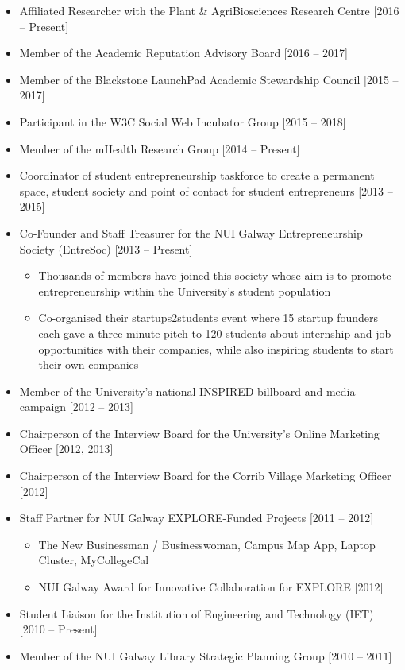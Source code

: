 \documentclass[10pt,a4paper]{res} %
\begin{document}
\begin{resume}
\begin{itemize}
\item Affiliated Researcher with the Plant \& AgriBiosciences Research Centre [2016 -- Present]
\item Member of the Academic Reputation Advisory Board [2016 -- 2017]
\item Member of the Blackstone LaunchPad Academic Stewardship Council [2015 -- 2017]
\item Participant in the W3C Social Web Incubator Group [2015 -- 2018]
\item Member of the mHealth Research Group [2014 -- Present]
\item Coordinator of student entrepreneurship taskforce to create a permanent space, student society and point of contact for student entrepreneurs [2013 -- 2015]
\item Co-Founder and Staff Treasurer for the NUI Galway Entrepreneurship Society (EntreSoc) [2013 -- Present]
\begin{itemize} \itemsep -2pt
\item Thousands of members have joined this society whose aim is to promote entrepreneurship within the University's student population
\item Co-organised their startups2students event where 15 startup founders each gave a three-minute pitch to 120 students about internship and job opportunities with their companies, while also inspiring students to start their own companies
\end{itemize}
\item Member of the University's national INSPIRED billboard and media campaign [2012 -- 2013] 
\item Chairperson of the Interview Board for the University's Online Marketing Officer [2012, 2013]
\item Chairperson of the Interview Board for the Corrib Village Marketing Officer [2012]
\item Staff Partner for NUI Galway EXPLORE-Funded Projects [2011 -- 2012]
\begin{itemize} \itemsep -2pt
\item The New Businessman / Businesswoman, Campus Map App, Laptop Cluster, MyCollegeCal
\item NUI Galway Award for Innovative Collaboration for EXPLORE [2012]
\end{itemize}
\item Student Liaison for the Institution of Engineering and Technology (IET) [2010 -- Present]
\item Member of the NUI Galway Library Strategic Planning Group [2010 -- 2011]

\end{itemize}
\end{resume}
\end{document}
